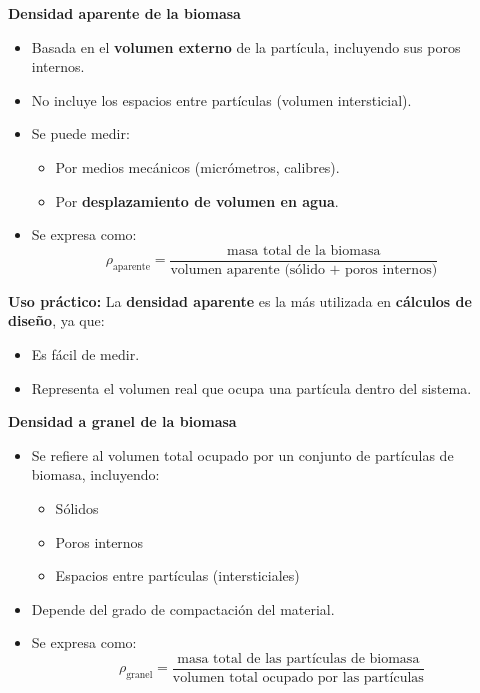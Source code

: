 \documentclass[../../main.tex]{subfiles}
\begin{document}
\begin{frame}{\textbf{Densidad aparente de la biomasa}}
\begin{itemize}
  \item Basada en el \textbf{volumen externo} de la partícula, incluyendo sus poros internos.
  \item No incluye los espacios entre partículas (volumen intersticial).
  \item Se puede medir:
  \begin{itemize}
    \item Por medios mecánicos (micrómetros, calibres).
    \item Por \textbf{desplazamiento de volumen en agua}.
  \end{itemize}
  \item Se expresa como:
  \[
  \rho_{\text{aparente}} = \frac{\text{masa total de la biomasa}}{\text{volumen aparente (sólido + poros internos)}}
  \]
\end{itemize}

\vspace{0.5em}
\textbf{Uso práctico:}  
La \textbf{densidad aparente} es la más utilizada en \textbf{cálculos de diseño}, ya que:
\begin{itemize}
  \item Es fácil de medir.
  \item Representa el volumen real que ocupa una partícula dentro del sistema.
\end{itemize}

\end{frame}

\begin{frame}{\textbf{Densidad a granel de la biomasa}}
\begin{itemize}
  \item Se refiere al volumen total ocupado por un conjunto de partículas de biomasa, incluyendo:
  \begin{itemize}
    \item Sólidos
    \item Poros internos
    \item Espacios entre partículas (intersticiales)
  \end{itemize}
  \item Depende del grado de compactación del material.
  \item Se expresa como:
  \[
  \rho_{\text{granel}} = \frac{\text{masa total de las partículas de biomasa}}{\text{volumen total ocupado por las partículas}} 
  \]
\end{itemize}
\end{frame}
\end{document}
